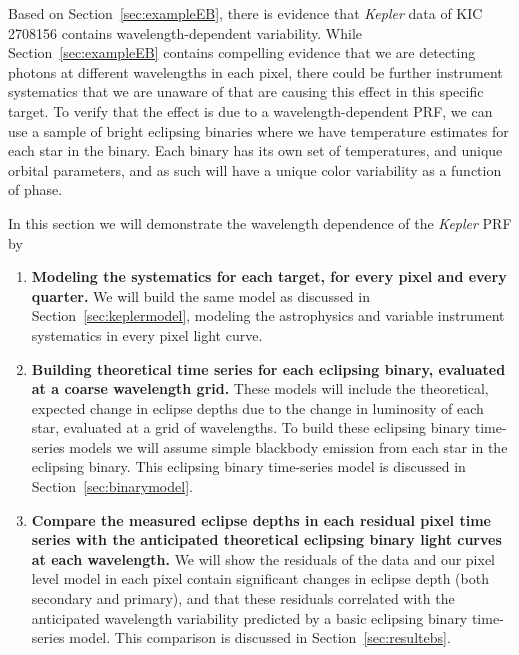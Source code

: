 \documentclass[iop]{emulateapj}
\newcommand{\kepler}{\emph{Kepler}\xspace}
\newcommand{\target}{KIC 2708156\xspace}
\begin{document}
Based on Section~\ref{sec:exampleEB}, there is evidence that \kepler data of \target contains wavelength-dependent variability. While Section~\ref{sec:exampleEB} contains compelling evidence that we are detecting photons at different wavelengths in each pixel, there could be further instrument systematics that we are unaware of that are causing this effect in this specific target. To verify that the effect is due to a wavelength-dependent PRF, we can use a sample of bright eclipsing binaries where we have temperature estimates for each star in the binary. Each binary has its own set of temperatures, and unique orbital parameters, and as such will have a unique color variability as a function of phase. %

In this section we will demonstrate the wavelength dependence of the \kepler PRF by \begin{enumerate}
\item \textbf{Modeling the systematics for each target, for every pixel and every quarter.} We will build the same model as discussed in Section~\ref{sec:keplermodel}, modeling the astrophysics and variable instrument systematics in every pixel light curve. 
\item \textbf{Building theoretical time series for each eclipsing binary, evaluated at a coarse wavelength grid.} These models will include the theoretical, expected change in eclipse depths due to the change in luminosity of each star, evaluated at a grid of wavelengths. To build these eclipsing binary time-series models we will assume simple blackbody emission from each star in the eclipsing binary. This eclipsing binary time-series model is discussed in Section~\ref{sec:binarymodel}. 
\item \textbf{Compare the measured eclipse depths in each residual pixel time series with the anticipated theoretical eclipsing binary light curves at each wavelength.} We will show the residuals of the data and our pixel level model in each pixel contain significant changes in eclipse depth (both secondary and primary), and that these residuals correlated with the anticipated wavelength variability predicted by a basic eclipsing binary time-series model. This comparison is discussed in Section~\ref{sec:resultebs}.
\end{enumerate}
\end{document}
